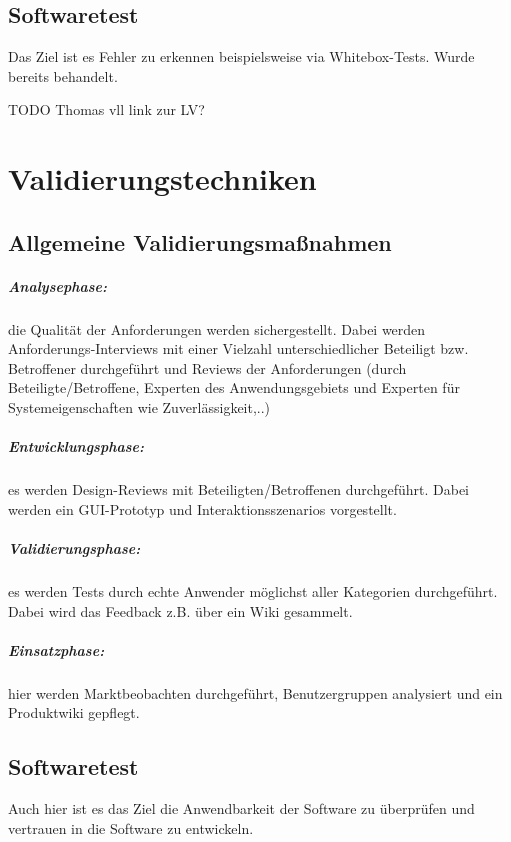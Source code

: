 \section{Softwaretest}
Das Ziel ist es Fehler zu erkennen beispielsweise via Whitebox-Tests. Wurde bereits behandelt.

TODO Thomas vll link zur LV?

\chapter{Validierungstechniken}
\section{Allgemeine Validierungsmaßnahmen}
\paragraph{Analysephase:} die Qualität der Anforderungen werden sichergestellt. Dabei werden Anforderungs-Interviews mit einer Vielzahl unterschiedlicher Beteiligt bzw. Betroffener durchgeführt und Reviews der Anforderungen (durch Beteiligte/Betroffene, Experten des Anwendungsgebiets und Experten für Systemeigenschaften wie Zuverlässigkeit,..)

\paragraph{Entwicklungsphase: } es werden Design-Reviews mit Beteiligten/Betroffenen durchgeführt. Dabei werden ein GUI-Prototyp und Interaktionsszenarios vorgestellt.

\paragraph{Validierungsphase: } es werden Tests durch echte Anwender möglichst aller Kategorien durchgeführt. Dabei wird das Feedback z.B. über ein Wiki gesammelt. 

\paragraph{Einsatzphase: } hier werden Marktbeobachten durchgeführt, Benutzergruppen analysiert und ein Produktwiki gepflegt.

\section{Softwaretest}
Auch hier ist es das Ziel die Anwendbarkeit der Software zu überprüfen und vertrauen in die Software zu entwickeln. 

